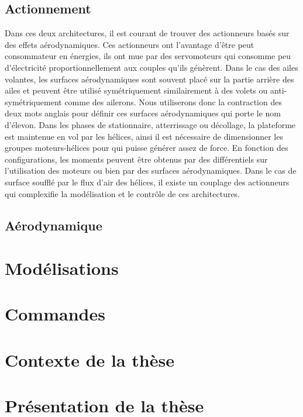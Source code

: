     \subsection{Actionnement}
    Dans ces deux architectures, il est courant de trouver des actionneurs basés sur des effets aérodynamiques. Ces actionneurs ont l'avantage d'être peut consommateur en énergies, ils ont mue par des servomoteurs qui consomme peu d'électricité proportionnellement aux couples qu'ils génèrent. Dans le cas des ailes volantes, les surfaces aérodynamiques sont souvent placé sur la partie arrière des ailes et peuvent être utilisé symétriquement similairement à des volets ou anti-symétriquement comme des ailerons. Nous utiliserons donc la contraction des deux mots anglais pour définir ces surfaces aérodynamiques qui porte le nom d'élevon.
    Dans les phases de stationnaire, atterrissage ou décollage, la plateforme est maintenue en vol par les hélices, ainsi il est nécessaire de dimensionner les groupes moteurs-hélices pour qui puisse générer assez de force. En fonction des configurations, les moments peuvent être obtenus par des différentiels sur l'utilisation des moteurs ou bien par des surfaces aérodynamiques. Dans le cas de surface soufflé par le flux d'air des hélices, il existe un couplage des actionneurs qui complexifie la modélisation et le contrôle de ces architectures.
    \subsection{Aérodynamique}

\section{Modélisations}


\section{Commandes}

\section{Contexte de la thèse}
\section{Présentation de la thèse}



